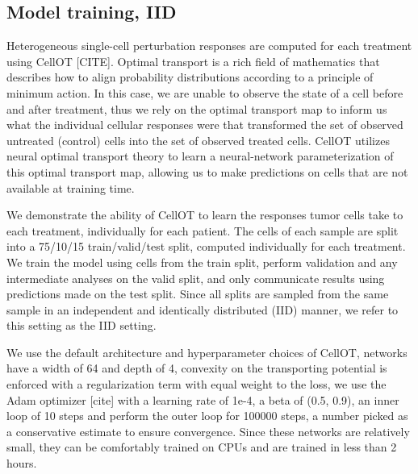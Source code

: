 
\subsection{Model training, IID}
Heterogeneous single-cell perturbation responses are computed for each treatment using CellOT [CITE]. Optimal transport is a rich field of mathematics that describes how to align probability distributions according to a principle of minimum action. In this case, we are unable to observe the state of a cell before and after treatment, thus we rely on the optimal transport map to inform us what the individual cellular responses were that transformed the set of observed untreated (control) cells into the set of observed treated cells. CellOT utilizes neural optimal transport theory to learn a neural-network parameterization of this optimal transport map, allowing us to make predictions on cells that are not available at training time.

We demonstrate the ability of CellOT to learn the responses tumor cells take to each treatment, individually for each patient. The cells of each sample are split into a 75/10/15 train/valid/test split, computed individually for each treatment. We train the model using cells from the train split, perform validation and any intermediate analyses on the valid split, and only communicate results using predictions made on the test split. Since all splits are sampled from the same sample in an independent and identically distributed (IID) manner, we refer to this setting as the IID setting.

We use the default architecture and hyperparameter choices of CellOT, networks have a width of 64 and depth of 4, convexity on the transporting potential is enforced with a regularization term with equal weight to the loss, we use the Adam optimizer [cite] with a learning rate of 1e-4, a beta of (0.5, 0.9), an inner loop of 10 steps and perform the outer loop for 100000 steps, a number picked as a conservative estimate to ensure convergence. Since these networks are relatively small, they can be comfortably trained on CPUs and are trained in less than 2 hours. 

